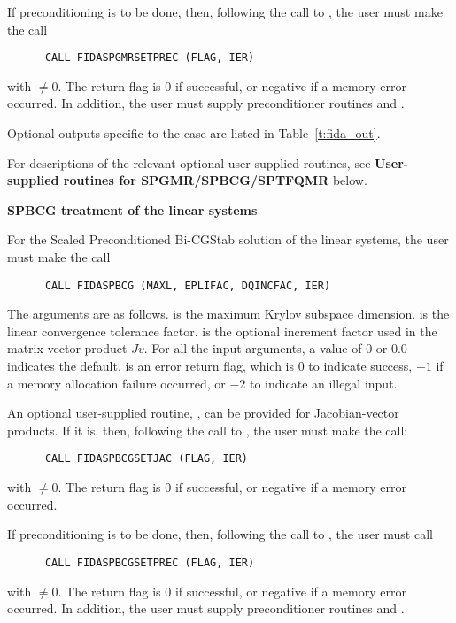 \begin{Steps}
  If preconditioning is to be done, then, following the call to
  , the user must make the call
\begin{verbatim}
      CALL FIDASPGMRSETPREC (FLAG, IER)
\end{verbatim}
  with  $\neq 0$.  The return flag  is 0 if successful,
  or negative if a memory error occurred.  In addition, the user must
  supply preconditioner routines  and .

  Optional outputs specific to the {\spgmr} case are listed in
  Table~\ref{t:fida_out}.

  For descriptions of the relevant optional user-supplied routines, see 
  {\bf User-supplied routines for SPGMR/SPBCG/SPTFQMR} below.


  {\s}{\p} {\bf SPBCG treatment of the linear systems}
  
  For the Scaled Preconditioned Bi-CGStab solution of the linear systems,
  the user must make the call
\begin{verbatim}
      CALL FIDASPBCG (MAXL, EPLIFAC, DQINCFAC, IER)
\end{verbatim}
  The arguments are as follows.
   is the maximum Krylov subspace dimension.
   is the linear convergence tolerance factor.
   is the optional increment factor used in the matrix-vector product
  $Jv$.
  For all the input arguments, a value of 0 or $0.0$ indicates the default.
   is an error return flag, which is $0$ to indicate success, $-1$
  if a memory allocation failure occurred, or $-2$ to indicate an illegal input.
  
  An optional user-supplied routine, , can be provided for
  Jacobian-vector products.  If it is, then, following the call to
  , the user must make the call:
\begin{verbatim}
      CALL FIDASPBCGSETJAC (FLAG, IER)
\end{verbatim}
  with  $\neq 0$.  The return flag  is 0 if successful,
  or negative if a memory error occurred.
  
  If preconditioning is to be done, then, following the
  call to , the user must call
\begin{verbatim}
      CALL FIDASPBCGSETPREC (FLAG, IER)
\end{verbatim}
  with  $\neq 0$.  The return flag  is 0 if successful,
  or negative if a memory error occurred.  In addition, the user must
  supply preconditioner routines  and .


\end{Steps}
